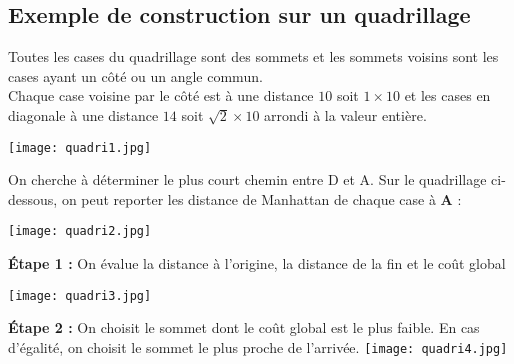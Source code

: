\subsection{Exemple de construction sur un quadrillage}

\begin{minipage}[c]{.65\linewidth}
Toutes les cases du quadrillage sont des sommets et les sommets voisins sont les cases ayant un côté ou un angle commun.\\
Chaque case voisine par le côté est à une distance $10$ soit $1 \times 10$ et les cases en diagonale à une distance $14$ soit $\sqrt{2} \times 10$ arrondi à la valeur entière.\\
\end{minipage}
\hfill %
\begin{minipage}[c]{.35\linewidth}
\begin{center}
\texttt{[image: quadri1.jpg]}
\end{center}
\end{minipage}


On cherche à déterminer le plus court chemin entre D et A. Sur le quadrillage ci-dessous, on peut reporter les distance de Manhattan de chaque case à \textbf{A} : 

\begin{center}
\texttt{[image: quadri2.jpg]}
\end{center}

\begin{multicols}{2}

\begin{center}

\textbf{\'Etape 1 :} On évalue la distance à l'origine, la distance de la fin et le coût global \\
\vfill

\texttt{[image: quadri3.jpg]}
\end{center}
\begin{center}


\textbf{\'Etape 2 :} On choisit le sommet dont le coût global est le plus faible. En cas d'égalité, on choisit le sommet le plus proche de l'arrivée.
\texttt{[image: quadri4.jpg]}
\end{center}
\end{multicols}


\newpage

